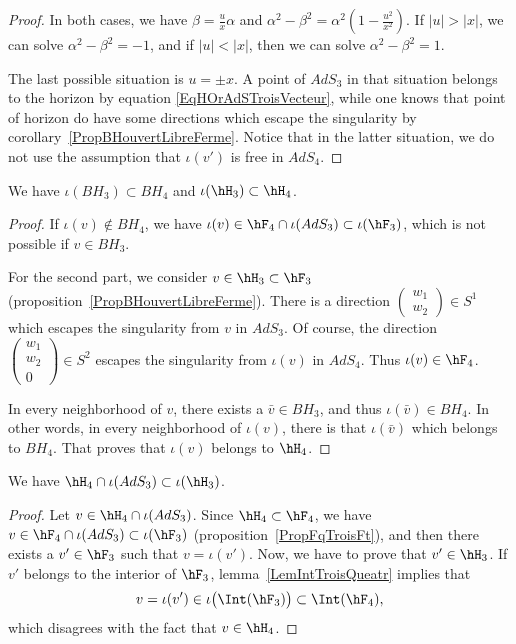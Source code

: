 \begin{proof}
		In both cases, we have $\beta=\frac{ u }{ x }\alpha$ and $\alpha^2-\beta^2=\alpha^2\left( 1-\frac{ u^2 }{ x^2 } \right)$. If $| u |>| x |$, we can solve $\alpha^2-\beta^2=-1$, and if $| u |<| x |$, then we can solve $\alpha^2-\beta^2=1$.

		The last possible situation is $u=\pm x$. A point of $AdS_3$ in that situation belongs to the horizon by equation \eqref{EqHOrAdSTroisVecteur}, while one knows that point of horizon do have some directions which escape the singularity by corollary~\ref{PropBHouvertLibreFerme}. Notice that in the latter situation, we do not use the assumption that $\iota(v')$ is free in $AdS_4$.
	\end{proof}

	\begin{corollary}		\label{CorBHBHHHHH}
		We have $\iota(BH_3)\subset BH_4$ and $\iota(\hH_3)\subset \hH_4$.
	\end{corollary}

	\begin{proof}
		If $\iota(v)\notin BH_4$, we have $\iota(v)\in \hF_4\cap\iota(AdS_3)\subset\iota(\hF_3)$, which is not possible if $v\in BH_3$.

		For the second part, we consider $v\in\hH_3\subset\hF_3$ (proposition~\ref{PropBHouvertLibreFerme}). There is a direction $\begin{pmatrix}
				w_1 \\
				w_2
			\end{pmatrix}\in S^1$ which escapes the singularity from $v$ in $AdS_3$. Of course, the direction $\begin{pmatrix}
				w_1 \\
				w_2 \\
				0
			\end{pmatrix}\in S^2$ escapes the singularity from $\iota(v)$ in $AdS_4$. Thus $\iota(v)\in\hF_4$.

		In every neighborhood of $v$, there exists a $\bar v\in BH_3$, and thus $\iota(\bar v)\in BH_4$. In other words, in every neighborhood of $\iota(v)$, there is that $\iota(\bar v)$ which belongs to $BH_4$. That proves that $\iota(v)$ belongs to $\hH_4$.
	\end{proof}

	\begin{lemma}		\label{LemHinteridansH}
		We have $\hH_4\cap\iota(AdS_3)\subset\iota(\hH_3)$.
	\end{lemma}

	\begin{proof}
		Let $v\in\hH_4\cap\iota(AdS_3)$. Since $\hH_4\subset\hF_4$, we have $v\in\hF_4\cap\iota(AdS_3)\subset\iota(\hF_3)$ (proposition~\ref{PropFqTroisFt}), and then there exists a $v'\in\hF_3$ such that $v=\iota(v')$. Now, we have to prove that $v'\in\hH_3$. If $v'$ belongs to the interior of $\hF_3$, lemma~\ref{LemIntTroisQueatr} implies that
		\begin{equation}
			v=\iota(v')\in\iota\big( \Int(\hF_3) \big)\subset\Int(\hF_4),
		\end{equation}
		which disagrees with the fact that $v\in\hH_4$.
	\end{proof}

